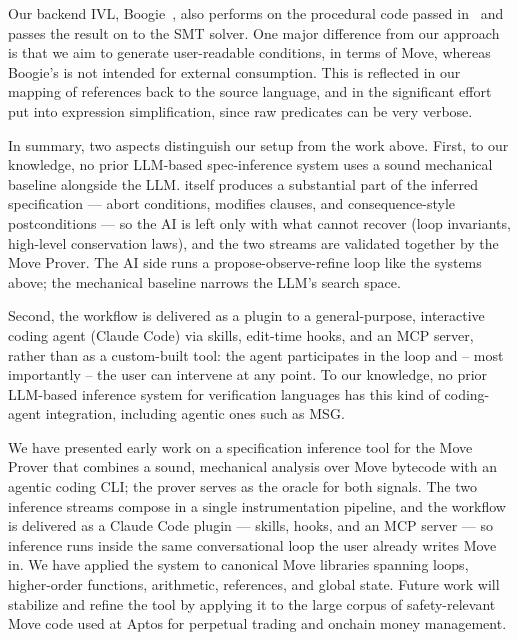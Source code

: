 Our backend IVL, Boogie~\cite{boogie,boogieIVL}, also performs \WP on the procedural code passed in~\cite{BL05} and passes the result on to the SMT solver. One major difference from our approach is that we aim to generate user-readable conditions, in terms of Move, whereas Boogie's \WP is not intended for external consumption. This is reflected in our mapping of references back to the source language, and in the significant effort put into expression simplification, since raw \WP predicates can be very verbose.

In summary, two aspects distinguish our setup from the work above.
First, to our knowledge, no prior LLM-based spec-inference system uses a sound mechanical baseline alongside the LLM.
\WP itself produces a substantial part of the inferred specification --- abort conditions, modifies clauses, and consequence-style postconditions --- so the AI is left only with what \WP cannot recover (loop invariants, high-level conservation laws), and the two streams are validated together by the Move Prover.
The AI side runs a propose-observe-refine loop like the systems above; the mechanical baseline narrows the LLM's search space.

Second, the workflow is delivered as a plugin to a general-purpose, interactive coding agent (Claude Code) via skills, edit-time hooks, and an MCP server, rather than as a custom-built tool: the agent participates in the loop and -- most importantly -- the user can intervene at any point.
To our knowledge, no prior LLM-based inference system for verification languages has this kind of coding-agent integration, including agentic ones such as MSG.


We have presented early work on a specification inference tool for the Move Prover that combines a sound, mechanical \WP analysis over Move bytecode with an agentic coding CLI; the prover serves as the oracle for both signals.
The two inference streams compose in a single instrumentation pipeline, and the workflow is delivered as a Claude Code plugin --- skills, hooks, and an MCP server --- so inference runs inside the same conversational loop the user already writes Move in.
We have applied the system to canonical Move libraries spanning loops, higher-order functions, arithmetic, references, and global state. Future work will stabilize and refine the tool by applying it to the large corpus of safety-relevant Move code used at Aptos for perpetual trading and onchain money management.

